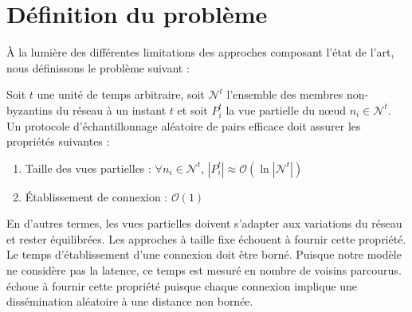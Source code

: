 
\section{Définition du problème}
\label{net:sec:problem}


À la lumière des différentes limitations des approches composant l'état de
l'art, nous définissons le problème suivant :

\begin{problem}
  \label{net:problem:properties}
  Soit $t$ une unité de temps arbitraire, soit $\mathcal{N}^t$ l'ensemble des
  membres non-byzantins du réseau à un instant $t$ et soit $P_i^t$ la vue
  partielle du nœud $n_i \in \mathcal{N}^t$. Un protocole d'échantillonnage
  aléatoire de pairs efficace doit assurer les propriétés suivantes :
  \begin{enumerate}
  \item Taille des vues partielles : \hfill $\forall n_i \in \mathcal{N}^t$,
    $|P_i^t| \approx \mathcal{O}(\ln |\mathcal{N}^t|)$
  \item Établissement de connexion : \hfill $\mathcal{O}(1)$
  \end{enumerate}
\end{problem}
En d'autres termes, les vues partielles doivent s'adapter aux variations du
réseau et rester équilibrées. Les approches à taille fixe échouent à fournir
cette propriété. Le temps d'établissement d'une connexion doit être
borné. Puisque notre modèle ne considère pas la latence, ce temps est mesuré en
nombre de voisins parcourus. \SCAMP échoue à fournir cette propriété puisque
chaque connexion implique une dissémination aléatoire à une distance non bornée.

